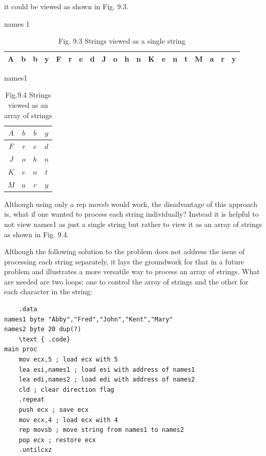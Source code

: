 \documentclass[10pt]{book}
\begin{document}
it could be viewed as shown in Fig. 9.3.

\begin{table}[htbp]
\begin{center}
names 1\\
\begin{tabular}{|l|l|l|l|l|l|l|l|l|l|l|l|l|l|l|l|l|l|l|l|}
\hline
A & b & b & y & F & r & e & d & J & o & h & n & K & e & n & t & M & a & r & y \\

\hline
\end{tabular}
\captionsetup{labelformat=empty}
\caption{Fig. 9.3 Strings viewed as a single string}
\end{center}
\end{table}

names1

\begin{table}[htbp]
\begin{center}
\captionsetup{labelformat=empty}
\caption{Fig.9.4 Strings viewed as an array of strings}
\begin{tabular}{|c|c|c|c|}
\hline
$A$ & $b$ & $b$ & $y$ \\
\hline
$F$ & $r$ & $e$ & $d$ \\
\hline
$J$ & $o$ & $h$ & $n$ \\
\hline
$K$ & $e$ & $n$ & $t$ \\
\hline
$M$ & $a$ & $r$ & $y$ \\
\hline
\end{tabular}
\end{center}
\end{table}

Although using only a rep movsb would work, the disadvantage of this approach is, what if one wanted to process each string individually? Instead it is helpful to not view names1 as just a single string but rather to view it as an array of strings as shown in Fig. 9.4.

Although the following solution to the problem does not address the issue of processing each string separately, it lays the groundwork for that in a future problem and illustrates a more versatile way to process an array of strings. What are needed are two loops: one to control the array of strings and the other for each character in the string:

\begin{verbatim}
    .data
names1 byte "Abby","Fred","John","Kent","Mary"
names2 byte 20 dup(?)
    \text { .code}
main proc
    mov ecx,5 ; load ecx with 5
    lea esi,names1 ; load esi with address of names1
    lea edi,names2 ; load edi with address of names2
    cld ; clear direction flag
    .repeat
    push ecx ; save ecx
    mov ecx,4 ; load ecx with 4
    rep movsb ; move string from names1 to names2
    pop ecx ; restore ecx
    .untilcxz
\end{verbatim}
\end{document}
